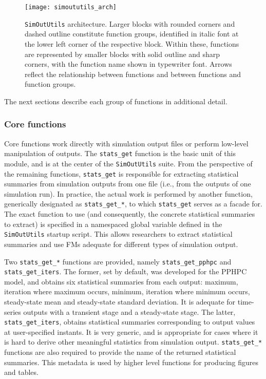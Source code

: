 \documentclass{article}
\newcommand{\progfunc}{\textnhtt}
\newcommand{\swpackage}{\texttt}
\begin{document}
\begin{figure}[ht]
\centering
\texttt{[image: simoututils\_arch]}
\caption{\swpackage{SimOutUtils} architecture. Larger blocks with rounded corners and dashed outline constitute function groups, identified in italic font at the lower left corner of the respective block. Within these, functions are represented by smaller blocks with solid outline and sharp corners, with the function name shown in typewriter font. Arrows reflect the relationship between functions and between functions and function groups.}
\label{fig:simoututils_arch}
\end{figure}

The next sections describe each group of functions in additional detail.

\subsubsection*{Core functions}

Core functions work directly with simulation output files or perform low-level manipulation of outputs. The \progfunc{stats\_get} function is the basic unit of this module, and is at the center of the \swpackage{SimOutUtils} suite. From the perspective of the remaining functions, \progfunc{stats\_get} is responsible for extracting statistical summaries from simulation outputs from one file (i.e., from the outputs of one simulation run). In practice, the actual work is performed by another function, generically designated as \progfunc{stats\_get\_*}, to which \progfunc{stats\_get} serves as a facade for. The exact function to use (and consequently, the concrete statistical summaries to extract) is specified in a namespaced global variable defined in the \swpackage{SimOutUtils} startup script. This allows researchers to extract statistical summaries and use FMs adequate for different types of simulation output.

Two \progfunc{stats\_get\_*} functions are provided, namely \progfunc{stats\_get\_pphpc} and \progfunc{stats\_get\_iters}. The former, set by default, was developed for the PPHPC model, and obtains six statistical summaries from each output: maximum, iteration where maximum occurs, minimum, iteration where minimum occurs, steady-state mean and steady-state standard deviation. It is adequate for time-series outputs with a transient stage and a steady-state stage. The latter, \progfunc{stats\_get\_iters}, obtains statistical summaries corresponding to output values at user-specified instants. It is very generic, and is appropriate for cases where it is hard to derive other meaningful statistics from simulation output. \progfunc{stats\_get\_*} functions are also required to provide the name of the returned statistical summaries. This metadata is used by higher level functions for producing figures and tables.
\end{document}
